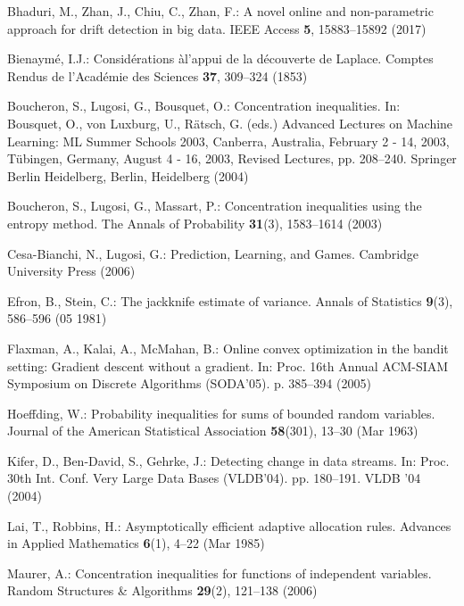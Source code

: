 \documentclass[runningheads, envcountsame, a4paper]{llncs}
\begin{document}
\begin{thebibliography}{10}
Bhaduri, M., Zhan, J., Chiu, C., Zhan, F.: A novel online and non-parametric
  approach for drift detection in big data. IEEE Access  \textbf{5},
  15883--15892 (2017)

Bienaymé, I.J.: Considérations àl'appui de la découverte de {L}aplace.
  Comptes Rendus de l'Académie des Sciences  \textbf{37},  309--324 (1853)

Boucheron, S., Lugosi, G., Bousquet, O.: Concentration inequalities. In:
  Bousquet, O., von Luxburg, U., R{\"a}tsch, G. (eds.) Advanced Lectures on
  Machine Learning: ML Summer Schools 2003, Canberra, Australia, February 2 -
  14, 2003, T{\"u}bingen, Germany, August 4 - 16, 2003, Revised Lectures, pp.
  208--240. Springer Berlin Heidelberg, Berlin, Heidelberg (2004)

Boucheron, S., Lugosi, G., Massart, P.: Concentration inequalities using the
  entropy method. The Annals of Probability  \textbf{31}(3),  1583--1614 (2003)

Cesa-{B}ianchi, N., Lugosi, G.: Prediction, Learning, and Games. Cambridge
  University Press (2006)

Efron, B., Stein, C.: The jackknife estimate of variance. Annals of Statistics
  \textbf{9}(3),  586--596 (05 1981)

Flaxman, A., Kalai, A., McMahan, B.: Online convex optimization in the bandit
  setting: Gradient descent without a gradient. In: Proc. 16th Annual ACM-SIAM
  Symposium on Discrete Algorithms (SODA'05). p. 385–394 (2005)

Hoeffding, W.: Probability inequalities for sums of bounded random variables.
  Journal of the American Statistical Association  \textbf{58}(301),  13--30
  (Mar 1963)

Kifer, D., Ben-David, S., Gehrke, J.: Detecting change in data streams. In:
  Proc. 30th Int. Conf. Very Large Data Bases (VLDB'04). pp. 180--191. VLDB '04
  (2004)

Lai, T., Robbins, H.: Asymptotically efficient adaptive allocation rules.
  Advances in Applied Mathematics  \textbf{6}(1),  4--22 (Mar 1985)

Maurer, A.: Concentration inequalities for functions of independent variables.
  Random Structures \& Algorithms  \textbf{29}(2),  121--138 (2006)


\end{thebibliography}
\end{document}
